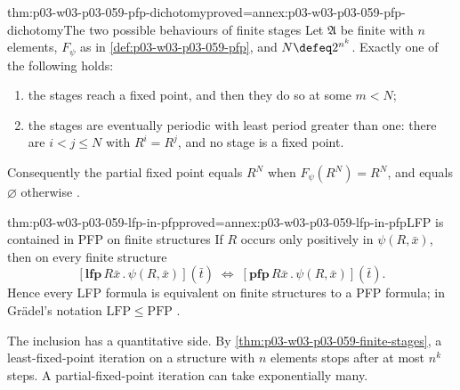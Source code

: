 \begin{hblemma}{thm:p03-w03-p03-059-pfp-dichotomy}{proved=annex:p03-w03-p03-059-pfp-dichotomy}{The two possible behaviours of finite stages}
Let \(\mathfrak A\) be finite with \(n\) elements, \(F_\psi\) as in
\cref{def:p03-w03-p03-059-pfp}, and \(N\defeq2^{n^k}\). Exactly one of
the following holds:
\begin{enumerate}
 \item the stages reach a fixed point, and then they do so at some
       \(m<N\);
 \item the stages are eventually periodic with least period greater than
       one: there are \(i<j\leq N\) with \(R^i=R^j\), and no stage is a
       fixed point.
\end{enumerate}
Consequently the partial fixed point equals \(R^N\) when
\(F_\psi(R^N)=R^N\), and equals \(\varnothing\) otherwise
\cite[p.~177]{Gradel2007FMTDescriptiveChapter}.
\end{hblemma}

\begin{hbtheorem}{thm:p03-w03-p03-059-lfp-in-pfp}{proved=annex:p03-w03-p03-059-lfp-in-pfp}{LFP is contained in PFP on finite structures}
If \(R\) occurs only positively in \(\psi(R,\bar x)\), then on every finite
structure
\[
 [\mathbf{lfp}\,R\bar x\,.\,\psi(R,\bar x)](\bar t)
 \;\Leftrightarrow\;
 [\mathbf{pfp}\,R\bar x\,.\,\psi(R,\bar x)](\bar t).
\]
Hence every LFP formula is equivalent on finite structures to a PFP
formula; in Gr\"adel's notation \(\mathrm{LFP}\leq\mathrm{PFP}\)
\cite[p.~177]{Gradel2007FMTDescriptiveChapter}.
\end{hbtheorem}

The inclusion has a quantitative side. By
\cref{thm:p03-w03-p03-059-finite-stages}, a least-fixed-point iteration on
a structure with \(n\) elements stops after at most \(n^k\) steps. A
partial-fixed-point iteration can take exponentially many.

